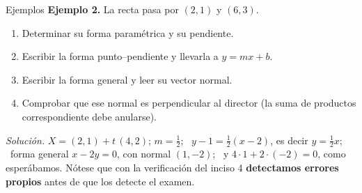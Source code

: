 \documentclass[aspectratio=169,10pt]{beamer}
\newcommand{\destaca}[1]{%
  \par\vspace{3pt}\noindent
  \colorbox{turquesaClaro}{%
    \parbox{\dimexpr\linewidth-2\fboxsep\relax}{\vspace{3pt}#1\vspace{3pt}}}%
  \par\vspace{3pt}}
\begin{document}
\begin{frame}{Ejemplos}
  \textbf{Ejemplo 2.} La recta pasa por $(2,1)$ y $(6,3)$.
  \begin{enumerate}
    \item Determinar su forma paramétrica y su pendiente.
    \item Escribir la forma punto--pendiente y llevarla a $y=mx+b$.
    \item Escribir la forma general y leer su vector normal.
    \item Comprobar que ese normal es perpendicular al director
      (la suma de productos correspondiente debe anularse).
  \end{enumerate}

  \vspace{0.4cm}
  \destaca{\small \textit{Solución.} $X=(2,1)+t\,(4,2)$;
  $m=\tfrac12$; \ $y-1=\tfrac12(x-2)$, es decir $y=\tfrac12 x$; \
  forma general $x-2y=0$, con normal $(1,-2)$; \ y
  $4\cdot 1+2\cdot(-2)=0$, como esperábamos. Nótese que con la
  verificación del inciso 4 \textbf{detectamos errores propios} antes
  de que los detecte el examen.}
\end{frame}
\end{document}

